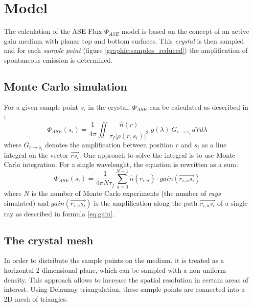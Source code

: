 \section{Model}

The calculation of the ASE Flux $\Phi_{ASE}$ model is based on the concept of an
active gain medium with planar top and bottom surfaces. This \emph{crystal} is
then sampled and for each \emph{sample point} (figure
\ref{graphic:samples_reduced}) the amplification of spontaneous emission is
determined. 


\subsection{Monte Carlo simulation}
\label{subsec:monteCarlo}

For a given sample point $s_i$ in the crystal, $\Phi_{ASE}$ can
be calculated as described in \cite{ASE2010}:
\begin{equation}
  \label{eq:phi_ase_daniel} 
  \Phi_{ASE}(s_i)=\frac{1}{4\pi}\iint
  \frac
    {\hat{n}(r)}
    {\tau_{f}|\rho(r,s_i)|^2}
  ~g(\lambda)
  ~G_{r\rightarrow s_i}
  ~dV d\lambda
\end{equation}
where $G_{r\rightarrow s_i}$ denotes the amplification between
position $r$ and $s_i$ as a line integral on the vector
$\overrightarrow{rs_i}$.  One approach to solve the integral is to use Monte
Carlo integration. For a single wavelenght, the equation is rewritten as a sum:
\begin{equation}
  \label{eq:monte_carlo_ase}
  \Phi_{ASE}(s_i) = 
  \frac{1}{4\pi N\tau_f}
  \sum^{N-1}_{u=0} \hat{n}(r_{i,u}) \cdot gain(\overrightarrow{r_{i,u}s_i})
\end{equation}
where $N$ is the number of Monte Carlo experiments (the number of \emph{rays}
simulated) and $gain(\overrightarrow{r_{i,u}s_i})$ is the amplification along the
path $\overrightarrow{r_{i,u}s_i}$ of a single ray as described in formula
\eqref{eq:gain}.


\subsection{The crystal mesh} \label{subsec:meshSampling}

In order to distribute the sample points on the medium, it is treated as
a horizontal 2-dimensional plane, which can be sampled with a non-uniform
density. This approach allows to increase the spatial resolution in certain
areas of interest. Using Delaunay triangulation, these sample points are
connected into a 2D mesh of triangles.

